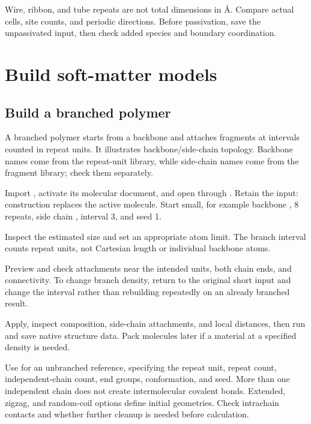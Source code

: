 Wire, ribbon, and tube repeats are not total dimensions in \AA. Compare actual cells, site counts, and periodic directions. Before passivation, save the unpassivated input, then check added species and boundary coordination.

\FloatBarrier
\section{Build soft-matter models}

\subsection{Build a branched polymer}\label{sec:branched-polymer-reference}

A branched polymer starts from a backbone and attaches fragments at intervals counted in repeat units. It illustrates backbone/side-chain topology. Backbone names come from the repeat-unit library, while side-chain names come from the fragment library; check them separately.

\begin{steps}
  \item Import , activate its molecular document, and open  through . Retain the input: construction replaces the active molecule. Start small, for example backbone , 8 repeats, side chain , interval 3, and seed 1.
  \item Inspect the estimated size and set an appropriate atom limit. The branch interval counts repeat units, not Cartesian length or individual backbone atoms.
  \item Preview and check attachments near the intended units, both chain ends, and connectivity. To change branch density, return to the original short input and change the interval rather than rebuilding repeatedly on an already branched result.
  \item Apply, inspect composition, side-chain attachments, and local distances, then run  and save native structure data. Pack molecules later if a material at a specified density is needed.
\end{steps}

Use  for an unbranched reference, specifying the repeat unit, repeat count, independent-chain count, end groups, conformation, and seed. More than one independent chain does not create intermolecular covalent bonds. Extended, zigzag, and random-coil options define initial geometries. Check intrachain contacts and whether further cleanup is needed before calculation.

